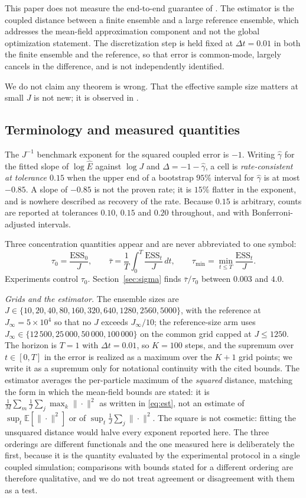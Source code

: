 \documentclass[pdflatex,sn-mathphys-num]{sn-jnl}
\theoremstyle{thmstyleone}
\theoremstyle{thmstyletwo}
\theoremstyle{thmstylethree}
\begin{document}
This paper does not measure the end-to-end guarantee of \cite[Theorem 3.8]{fkr2024}. The estimator is the coupled distance between a finite ensemble and a large reference ensemble, which addresses the mean-field approximation component and not the global optimization statement. The discretization step is held fixed at $\Delta t=0.01$ in both the finite ensemble and the reference, so that error is common-mode, largely cancels in the difference, and is not independently identified.

We do not claim any theorem is wrong. That the effective sample size matters at small $J$ is not new; it is observed in \cite[Subsection 2.6]{ghv2025}.

\subsection{Terminology and measured quantities}\label{sec:terms}

The $J^{-1}$ benchmark exponent for the squared coupled error is $-1$. Writing $\hat\gamma$ for the fitted slope of $\log\hat E$ against $\log J$ and $\Delta=-1-\hat\gamma$, a cell is \emph{rate-consistent at tolerance $0.15$} when the upper end of a bootstrap $95\%$ interval for $\hat\gamma$ is at most $-0.85$. A slope of $-0.85$ is not the proven rate; it is $15\%$ flatter in the exponent, and is nowhere described as recovery of the rate. Because $0.15$ is arbitrary, counts are reported at tolerances $0.10$, $0.15$ and $0.20$ throughout, and with Bonferroni-adjusted intervals.

Three concentration quantities appear and are never abbreviated to one symbol:
\[
\tau_0=\frac{\mathrm{ESS}_0}{J},\qquad
\bar\tau=\frac1T\int_0^T\frac{\mathrm{ESS}_t}{J}\,dt,\qquad
\tau_{\min}=\min_{t\le T}\frac{\mathrm{ESS}_t}{J}.
\]
Experiments control $\tau_0$. Section~\ref{sec:sigma} finds $\bar\tau/\tau_0$ between $0.003$ and $4.0$.

\emph{Grids and the estimator.} The ensemble sizes are $J\in\{10,20,40,80,160,320,640,1280,2560,5000\}$, with the reference at $J_\infty=5\times10^4$ so that no $J$ exceeds $J_\infty/10$; the reference-size arm uses $J_\infty\in\{12\,500,25\,000,50\,000,100\,000\}$ on the common grid capped at $J\le1250$. The horizon is $T=1$ with $\Delta t=0.01$, so $K=100$ steps, and the supremum over $t\in[0,T]$ in the error is realized as a maximum over the $K+1$ grid points; we write it as a supremum only for notational continuity with the cited bounds. The estimator averages the per-particle maximum of the \emph{squared} distance, matching the form in which the mean-field bounds are stated: it is $\frac1M\sum_m\frac1J\sum_j\max_k\|\cdot\|^2$ as written in \eqref{eq:est}, not an estimate of $\sup_t\mathbb E[\|\cdot\|^2]$ or of $\sup_t\frac1J\sum_j\|\cdot\|^2$. The square is not cosmetic: fitting the unsquared distance would halve every exponent reported here. The three orderings are different functionals and the one measured here is deliberately the first, because it is the quantity evaluated by the experimental protocol in a single coupled simulation; comparisons with bounds stated for a different ordering are therefore qualitative, and we do not treat agreement or disagreement with them as a test.
\end{document}
